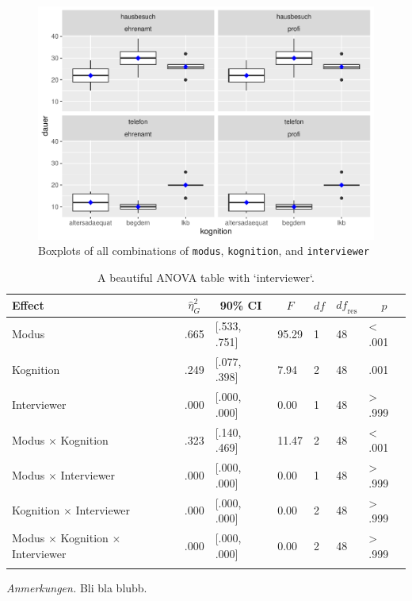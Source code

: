 \documentclass[
  doc,floatsintext]{apa6}
\begin{document}
\begin{figure}
\centering
\includegraphics{desc_aov_files/figure-latex/df3boxplot-1.pdf}
\caption{\label{fig:df3boxplot}Boxplots of all combinations of \texttt{modus}, \texttt{kognition}, and \texttt{interviewer}}
\end{figure}

\begin{table}[tbp]

\begin{center}
\begin{threeparttable}

\caption{\label{tab:tabanova3}A beautiful ANOVA table with `interviewer`.}

\begin{tabular}{lllllll}
\toprule
Effect & \multicolumn{1}{c}{$\hat{\eta}^2_G$} & \multicolumn{1}{c}{90\% CI} & \multicolumn{1}{c}{$F$} & \multicolumn{1}{c}{$\mathit{df}$} & \multicolumn{1}{c}{$\mathit{df}_{\mathrm{res}}$} & \multicolumn{1}{c}{$p$}\\
\midrule
Modus & .665 & {}[.533, .751] & 95.29 & 1 & 48 & < .001\\
Kognition & .249 & {}[.077, .398] & 7.94 & 2 & 48 & .001\\
Interviewer & .000 & {}[.000, .000] & 0.00 & 1 & 48 & > .999\\
Modus $\times$ Kognition & .323 & {}[.140, .469] & 11.47 & 2 & 48 & < .001\\
Modus $\times$ Interviewer & .000 & {}[.000, .000] & 0.00 & 1 & 48 & > .999\\
Kognition $\times$ Interviewer & .000 & {}[.000, .000] & 0.00 & 2 & 48 & > .999\\
Modus $\times$ Kognition $\times$ Interviewer & .000 & {}[.000, .000] & 0.00 & 2 & 48 & > .999\\
\bottomrule
\addlinespace
\end{tabular}

\begin{tablenotes}[para]
\normalsize{\textit{Anmerkungen.} Bli bla blubb.}
\end{tablenotes}

\end{threeparttable}
\end{center}

\end{table}
\end{document}
